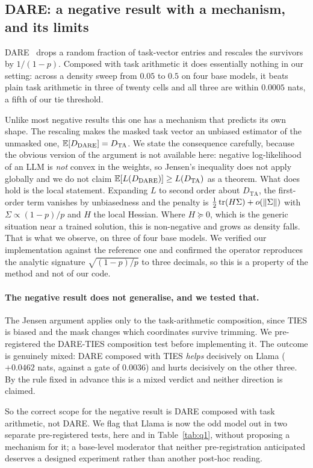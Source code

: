 \subsection{DARE: a negative result with a mechanism, and its limits}
\label{subsec:dare}

DARE~\citep{yu2024dare} drops a random fraction of task-vector entries
and rescales the survivors by $1/(1-p)$. Composed with task arithmetic it
does essentially nothing in our setting: across a density sweep from
$0.05$ to $0.5$ on four base models, it beats plain task arithmetic in
three of twenty cells and all three are within $0.0005$ nats, a fifth of
our tie threshold.

Unlike most negative results this one has a mechanism that predicts its
own shape. The rescaling makes the masked task vector an unbiased
estimator of the unmasked one, $\mathbb{E}[D_{\mathrm{DARE}}] = D_{\mathrm{TA}}$.
We state the consequence carefully, because the obvious version of the
argument is not available here: negative log-likelihood of an LLM is
\emph{not} convex in the weights, so Jensen's inequality does not apply
globally and we do not claim
$\mathbb{E}[L(D_{\mathrm{DARE}})] \geq L(D_{\mathrm{TA}})$ as a theorem. What
does hold is the local statement. Expanding $L$ to second order about
$D_{\mathrm{TA}}$, the first-order term vanishes by unbiasedness and the
penalty is $\tfrac12\operatorname{tr}(H\Sigma) + o(\|\Sigma\|)$ with
$\Sigma \propto (1-p)/p$ and $H$ the local Hessian. Where $H \succeq 0$,
which is the generic situation near a trained solution, this is
non-negative and grows as density falls. That is what we observe,
on three of four base models. We verified our implementation against the
reference one and confirmed the operator reproduces the analytic signature
$\sqrt{(1-p)/p}$ to three decimals, so this is a property of the method
and not of our code.

\paragraph{The negative result does not generalise, and we tested that.}
The Jensen argument applies only to the task-arithmetic composition, since
TIES is biased and the mask changes which coordinates survive trimming. We
pre-registered the DARE-TIES composition test before implementing it. The
outcome is genuinely mixed: DARE composed with TIES \emph{helps}
decisively on Llama ($+0.0462$ nats, against a gate of $0.0036$) and hurts
decisively on the other three. By the rule fixed in advance this is a
mixed verdict and neither direction is claimed.

So the correct scope for the negative result is DARE composed with task
arithmetic, not DARE. We flag that Llama is now the odd model out in two
separate pre-registered tests, here and in Table~\ref{tab:q1}, without
proposing a mechanism for it; a base-level moderator that neither
pre-registration anticipated deserves a designed experiment rather than
another post-hoc reading.
